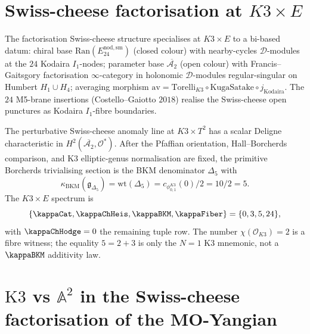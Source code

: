 \section{Swiss-cheese factorisation at \texorpdfstring{$K3 \times E$}{K3 times E}}
\label{sec:fsc-new}

\begin{remark}
\label{rem:fsc-K3xE-bi-based}
The factorisation Swiss-cheese structure specialises at $K3 \times E$ to a bi-based datum: chiral base $\mathrm{Ran}(E^{\mathrm{nod,sm}}_{24})$ (closed colour) with nearby-cycles $\mathcal{D}$-modules at the $24$ Kodaira $I_1$-nodes; parameter base $\overline{\mathcal{A}_2}$ (open colour) with Francis--Gaitsgory factorisation $\infty$-category in holonomic $\mathcal{D}$-modules regular-singular on Humbert $H_1 \cup H_4$; averaging morphism $\mathrm{av} = \mathrm{Torelli}_{K3} \circ \mathrm{KugaSatake} \circ j_{\mathrm{Kodaira}}$. The $24$ M5-brane insertions (Costello--Gaiotto $2018$) realise the Swiss-cheese open punctures as Kodaira $I_1$-fibre boundaries.
\end{remark}

\begin{remark}
\label{rem:fsc-delta5-1loop}
The perturbative Swiss-cheese anomaly line at $K3 \times T^2$ has a
scalar Deligne characteristic in
$H^2(\overline{\mathcal{A}_2}, \mathcal{O}^*)$. After the Pfaffian
orientation, Hall--Borcherds comparison, and K3 elliptic-genus
normalisation are fixed, the primitive Borcherds trivialising section is
the BKM denominator $\Delta_5$ with
\[
 \kappa_{\mathrm{BKM}}(\mathfrak g_{\Delta_5})
 =\mathrm{wt}(\Delta_5)
 =c_{\phi_{0,1}^{K3}}(0)/2
 =10/2=5 .
\]
The $K3 \times E$ spectrum is
\[
 \{\kappaCat,\kappaChHeis,
 \kappaBKM,\kappaFiber\}
 =\{0,3,5,24\},
\]
with $\kappaChHodge=0$ the remaining tuple row. The number
$\chi(\mathcal O_{K3})=2$ is a fibre witness; the equality
$5=2+3$ is only the $N=1$ K3 mnemonic, not a
$\kappaBKM$ additivity law.
\end{remark}

\section{\texorpdfstring{$\mathrm{K3}$}{K3} vs \texorpdfstring{$\mathbb A^2$}{A-squared} in the Swiss-cheese factorisation of the MO-Yangian}
\label{sec:fsc-K3-vs-A2}

